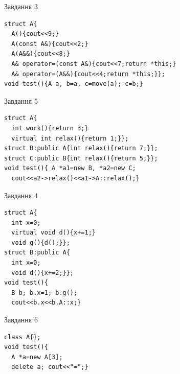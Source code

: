 \documentclass[12pt, ukrainian]{article}
\begin{document}
{{{{{{{{{\begin{minipage}[t]{11cm}
               
{\begin{center}Завдання {3}\end{center}}
\vspace{-6mm}

\begin{verbatim}
struct A{
  A(){cout<<9;}
  A(const A&){cout<<2;}
  A(A&&){cout<<8;}
  A& operator=(const A&){cout<<7;return *this;}
  A& operator=(A&&){cout<<4;return *this;}};
void test(){A a, b=a, c=move(a); c=b;}
\end{verbatim}            


               
{\begin{center}Завдання {5}\end{center}}
\vspace{-6mm}

\begin{verbatim}
struct A{
  int work(){return 3;}
  virtual int relax(){return 1;}};
struct B:public A{int relax(){return 7;}};
struct C:public B{int relax(){return 5;}};
void test(){ A *a1=new B, *a2=new C;
  cout<<a2->relax()<<a1->A::relax();}
\end{verbatim}            


\end{minipage}
\vline \hspace{8mm}
\begin{minipage}[t]{7cm}
               
{\begin{center}Завдання {4}\end{center}}
\vspace{-6mm}

\begin{verbatim}
struct A{
  int x=0;
  virtual void d(){x+=1;}
  void g(){d();}};
struct B:public A{
  int x=0;
  void d(){x+=2;}};
void test(){
  B b; b.x=1; b.g();
  cout<<b.x<<b.A::x;}
\end{verbatim}            


               
{\begin{center}Завдання {6}\end{center}}
\vspace{-6mm}

\begin{verbatim}
class A{};
void test(){
  A *a=new A[3]; 
  delete a; cout<<"=";} 
\end{verbatim}            



\end{minipage}}}}}}}}}}
\end{document}
